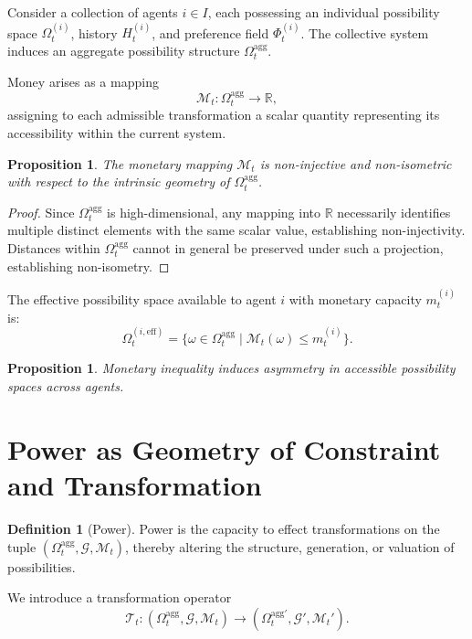 \documentclass[11pt,a4paper]{article}
\newtheorem{proposition}[theorem]{Proposition}
\theoremstyle{definition}
\newtheorem{definition}[theorem]{Definition}
\theoremstyle{remark}
\begin{document}
Consider a collection of agents $i \in I$, each possessing an individual possibility space $\Omega_t^{(i)}$, history $H_t^{(i)}$, and preference field $\Phi_t^{(i)}$. The collective system induces an aggregate possibility structure $\Omega_t^{\mathrm{agg}}$.

Money arises as a mapping
\[
\mathcal{M}_t : \Omega_t^{\mathrm{agg}} \rightarrow \mathbb{R},
\]
assigning to each admissible transformation a scalar quantity representing its accessibility within the current system.

\begin{proposition}
The monetary mapping $\mathcal{M}_t$ is non-injective and non-isometric with respect to the intrinsic geometry of $\Omega_t^{\mathrm{agg}}$.
\end{proposition}

\begin{proof}
Since $\Omega_t^{\mathrm{agg}}$ is high-dimensional, any mapping into $\mathbb{R}$ necessarily identifies multiple distinct elements with the same scalar value, establishing non-injectivity. Distances within $\Omega_t^{\mathrm{agg}}$ cannot in general be preserved under such a projection, establishing non-isometry.
\end{proof}

The effective possibility space available to agent $i$ with monetary capacity $m_t^{(i)}$ is:
\[
\Omega_t^{(i,\mathrm{eff})} = \{ \omega \in \Omega_t^{\mathrm{agg}} \mid \mathcal{M}_t(\omega) \leq m_t^{(i)} \}.
\]

\begin{proposition}
Monetary inequality induces asymmetry in accessible possibility spaces across agents.
\end{proposition}

\section{Power as Geometry of Constraint and Transformation}

\begin{definition}[Power]
Power is the capacity to effect transformations on the tuple $(\Omega_t^{\mathrm{agg}}, \mathcal{G}, \mathcal{M}_t)$, thereby altering the structure, generation, or valuation of possibilities.
\end{definition}

We introduce a transformation operator
\[
\mathcal{T}_t : (\Omega_t^{\mathrm{agg}}, \mathcal{G}, \mathcal{M}_t) \rightarrow (\Omega_t^{\mathrm{agg}\prime}, \mathcal{G}', \mathcal{M}_t').
\]
\end{document}
